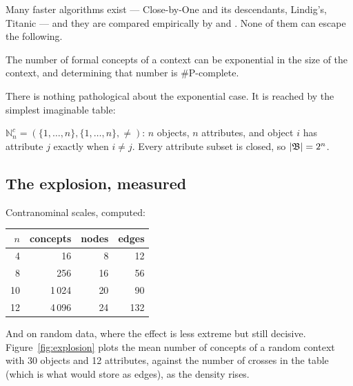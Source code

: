 Many faster algorithms exist --- Close-by-One and its descendants, Lindig's,
Titanic --- and they are compared empirically by \citet{kuznetsov2002} and
\citet{krajca2010}. None of them can escape the following.

\begin{theorem}
The number of formal concepts of a context can be exponential in the size of
the context, and determining that number is $\#\mathrm{P}$-complete.
\end{theorem}

There is nothing pathological about the exponential case. It is reached by the
simplest imaginable table:

\begin{definition}
$\mathbb{N}_n^c = (\{1,\dots,n\}, \{1,\dots,n\}, \neq)$: $n$ objects, $n$
attributes, and object $i$ has attribute $j$ exactly when $i \neq j$. Every
attribute subset is closed, so $|\mathfrak{B}| = 2^n$.
\end{definition}

\subsection{The explosion, measured}
\label{sec:explosion}

\begin{measured}
Contranominal scales, computed:

\smallskip
\centering\small
\begin{tabular}{rrrr}
\toprule
$n$ & concepts & \odag{} nodes & \odag{} edges\\
\midrule
 4 &      16 &  8 &  12\\
 8 &     256 & 16 &  56\\
10 &   1\,024 & 20 &  90\\
12 &   4\,096 & 24 & 132\\
\bottomrule
\end{tabular}
\end{measured}

\noindent
And on random data, where the effect is less extreme but still decisive.
Figure~\ref{fig:explosion} plots the mean number of concepts of a random
context with 30 objects and 12 attributes, against the number of crosses in
the table (which is what \odag{} would store as edges), as the density rises.

